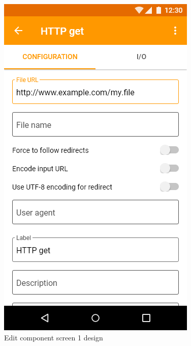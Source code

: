 \begin{figure}\centering
    \begin{minipage}[b]{0.32\textwidth}
    	\includegraphics[width=\textwidth]{pics/xd/Edit component - configuration.png}
    	\caption[Edit component screen 1]{Edit component screen 1 design}\label{fig:xdEditComponent1}
    \end{minipage}
    \begin{minipage}[b]{0.32\textwidth}

\end{minipage}
\end{figure}
